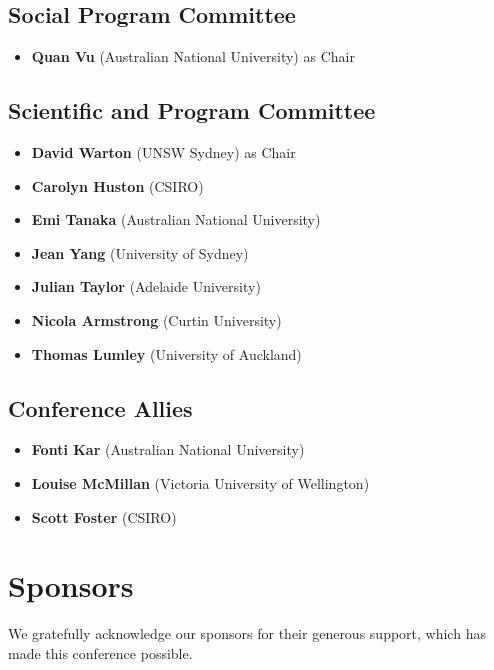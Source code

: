 \documentclass[
]{scrreprt}
\providecommand{\tightlist}{%
  \setlength{\itemsep}{0pt}\setlength{\parskip}{0pt}}\usepackage{longtable,booktabs,array}
\begin{document}
\section{Social Program Committee}\label{social-program-committee}

\begin{itemize}
\tightlist
\item
  \textbf{Quan Vu} (Australian National University) as Chair
\end{itemize}

\section{Scientific and Program
Committee}\label{scientific-and-program-committee}

\begin{itemize}
\tightlist
\item
  \textbf{David Warton} (UNSW Sydney) as Chair
\item
  \textbf{Carolyn Huston} (CSIRO)
\item
  \textbf{Emi Tanaka} (Australian National University)
\item
  \textbf{Jean Yang} (University of Sydney)
\item
  \textbf{Julian Taylor} (Adelaide University)
\item
  \textbf{Nicola Armstrong} (Curtin University)
\item
  \textbf{Thomas Lumley} (University of Auckland)
\end{itemize}

\section{Conference Allies}\label{sec-allies}

\begin{itemize}
\tightlist
\item
  \textbf{Fonti Kar} (Australian National University)
\item
  \textbf{Louise McMillan} (Victoria University of Wellington)
\item
  \textbf{Scott Foster} (CSIRO)
\end{itemize}

\chapter{Sponsors}\label{sponsors}

We gratefully acknowledge our sponsors for their generous support, which
has made this conference possible.
\end{document}
